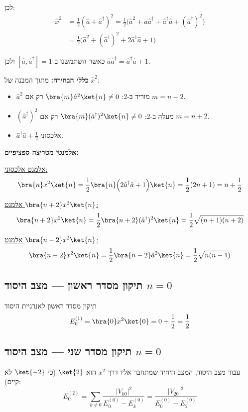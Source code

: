 לכן:
\begin{align}
\hat{x}^2 &= \frac{1}{2}(\hat{a} + \hat{a}^\dagger)^2 = \frac{1}{2}\Big(\hat{a}^2 + \hat{a}\hat{a}^\dagger + \hat{a}^\dagger\hat{a} + (\hat{a}^\dagger)^2\Big) \\
&= \frac{1}{2}\Big(\hat{a}^2 + (\hat{a}^\dagger)^2 + 2\hat{a}^\dagger\hat{a} + 1\Big)
\end{align}

כאשר השתמשנו ב-$[\hat{a},\hat{a}^\dagger]=1$ ולכן $\hat{a}\hat{a}^\dagger = \hat{a}^\dagger\hat{a} + 1$.

\textbf{כללי הבחירה:} מתוך המבנה של $\hat{x}^2$:
\begin{itemize}
\item $\hat{a}^2$ מוריד ב-2: $\bra{m}\hat{a}^2\ket{n} \neq 0$ רק אם $m = n-2$.
\item $(\hat{a}^\dagger)^2$ מעלה ב-2: $\bra{m}(\hat{a}^\dagger)^2\ket{n} \neq 0$ רק אם $m = n+2$.
\item $\hat{a}^\dagger\hat{a} + \frac{1}{2}$ אלכסוני.
\end{itemize}

\textbf{אלמנטי מטריצה ספציפיים:}

\underline{אלמנט אלכסוני:}
\[
\bra{n}x^2\ket{n} = \frac{1}{2}\bra{n}\Big(2\hat{a}^\dagger\hat{a} + 1\Big)\ket{n} = \frac{1}{2}(2n + 1) = n + \frac{1}{2}
\]

\underline{אלמנט $\bra{n+2}x^2\ket{n}$:}
\[
\bra{n+2}x^2\ket{n} = \frac{1}{2}\bra{n+2}(\hat{a}^\dagger)^2\ket{n} = \frac{1}{2}\sqrt{(n+1)(n+2)}
\]

\underline{אלמנט $\bra{n-2}x^2\ket{n}$:}
\[
\bra{n-2}x^2\ket{n} = \frac{1}{2}\bra{n-2}\hat{a}^2\ket{n} = \frac{1}{2}\sqrt{n(n-1)}
\]

\subsection{תיקון מסדר ראשון — מצב היסוד $n=0$}

\begin{resultbox}{תיקון מסדר ראשון לאנרגיית היסוד}
\[
E_0^{(1)} = \bra{0}x^2\ket{0} = 0 + \frac{1}{2} = \frac{1}{2}
\]
\end{resultbox}

\subsection{תיקון מסדר שני — מצב היסוד $n=0$}

עבור מצב היסוד, המצב היחיד שמתחבר אליו דרך $x^2$ הוא $\ket{2}$ (כי $\ket{-2}$ לא קיים):
\[
E_0^{(2)} = \sum_{k\neq 0}\frac{|V_{k0}|^2}{E_0^{(0)} - E_k^{(0)}} = \frac{|V_{20}|^2}{E_0^{(0)} - E_2^{(0)}}
\]

